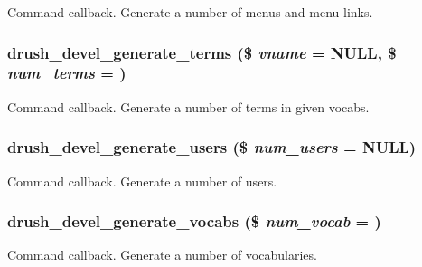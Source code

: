\label{devel__generate_8drush_8inc_a7a543f5e7641e7fa1c6d9dee12d8b93b}
Command callback. Generate a number of menus and menu links. \hypertarget{devel__generate_8drush_8inc_ac6e9ac6d26aa0fe2d1ac268e28c6c036}{
\subsubsection[{drush\_\-devel\_\-generate\_\-terms}]{\setlength{\rightskip}{0pt plus 5cm}drush\_\-devel\_\-generate\_\-terms (\$ {\em vname} = {\ttfamily NULL}, \/  \$ {\em num\_\-terms} = {})}}
\label{devel__generate_8drush_8inc_ac6e9ac6d26aa0fe2d1ac268e28c6c036}
Command callback. Generate a number of terms in given vocabs. \hypertarget{devel__generate_8drush_8inc_aa9e2153179489bacf746e63ce8d95141}{
\subsubsection[{drush\_\-devel\_\-generate\_\-users}]{\setlength{\rightskip}{0pt plus 5cm}drush\_\-devel\_\-generate\_\-users (\$ {\em num\_\-users} = {\ttfamily NULL})}}
\label{devel__generate_8drush_8inc_aa9e2153179489bacf746e63ce8d95141}
Command callback. Generate a number of users. \hypertarget{devel__generate_8drush_8inc_a64dcfae39a21d5c14ad6446bca087778}{
\subsubsection[{drush\_\-devel\_\-generate\_\-vocabs}]{\setlength{\rightskip}{0pt plus 5cm}drush\_\-devel\_\-generate\_\-vocabs (\$ {\em num\_\-vocab} = {})}}
\label{devel__generate_8drush_8inc_a64dcfae39a21d5c14ad6446bca087778}
Command callback. Generate a number of vocabularies. 
